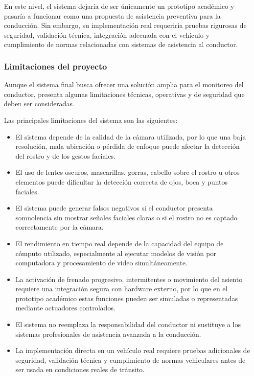 \documentclass[conference]{IEEEtran}
\begin{document}
En este nivel, el sistema dejaría de ser únicamente un prototipo académico y pasaría a funcionar como una propuesta de asistencia preventiva para la conducción. Sin embargo, su implementación real requeriría pruebas rigurosas de seguridad, validación técnica, integración adecuada con el vehículo y cumplimiento de normas relacionadas con sistemas de asistencia al conductor.


\subsubsection{Limitaciones del proyecto}

Aunque el sistema final busca ofrecer una solución amplia para el monitoreo del conductor, presenta algunas limitaciones técnicas, operativas y de seguridad que deben ser consideradas.

Las principales limitaciones del sistema son las siguientes:

\begin{itemize}
    \item El sistema depende de la calidad de la cámara utilizada, por lo que una baja resolución, mala ubicación o pérdida de enfoque puede afectar la detección del rostro y de los gestos faciales.
    
    \item El uso de lentes oscuros, mascarillas, gorras, cabello sobre el rostro u otros elementos puede dificultar la detección correcta de ojos, boca y puntos faciales.
    
    \item El sistema puede generar falsos negativos si el conductor presenta somnolencia sin mostrar señales faciales claras o si el rostro no es captado correctamente por la cámara.
    
    \item El rendimiento en tiempo real depende de la capacidad del equipo de cómputo utilizado, especialmente al ejecutar modelos de visión por computadora y procesamiento de video simultáneamente.
    
    \item La activación de frenado progresivo, intermitentes o movimiento del asiento requiere una integración segura con hardware externo, por lo que en el prototipo académico estas funciones pueden ser simuladas o representadas mediante actuadores controlados.
    
    \item El sistema no reemplaza la responsabilidad del conductor ni sustituye a los sistemas profesionales de asistencia avanzada a la conducción.
    
    \item La implementación directa en un vehículo real requiere pruebas adicionales de seguridad, validación técnica y cumplimiento de normas vehiculares antes de ser usada en condiciones reales de tránsito.
\end{itemize}
\end{document}
